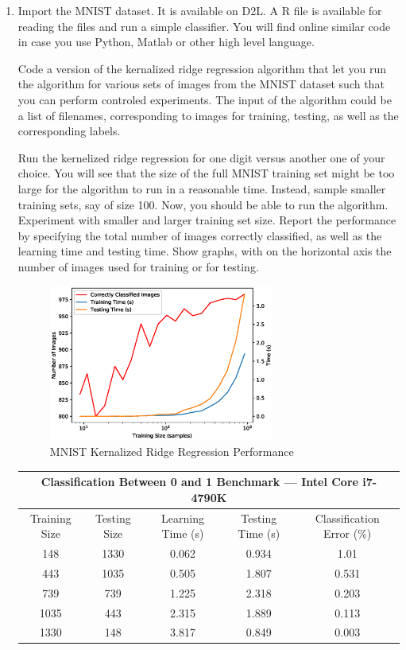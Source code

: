 \documentclass{article}[12pt]
\begin{document}
\begin{enumerate}
\item Import the MNIST dataset. It is available on D2L. A R file is available for reading the files and run a simple classifier.  You will find online similar code in case you use Python,  Matlab or other high level language. 

Code a version of the kernalized ridge regression algorithm that let you run the algorithm for various sets of images from the MNIST dataset such that you can perform controled experiments. The input of the algorithm could be a list of filenames, corresponding to images for training, testing, as well as the corresponding labels.  

Run the kernelized ridge regression for one digit versus another one of your choice. You will see that the size of the full MNIST training set might be too large for the algorithm to run in a reasonable time. Instead, sample smaller training sets, say of size 100. Now, you should be able to run the algorithm. Experiment with smaller and larger training set size. Report the performance by specifying the total number of images correctly classified, as well as the learning time and testing time. Show graphs, with on the horizontal axis the number of images used for training or for testing. 

\begin{figure}[H]
\centering
\includegraphics[width=0.7\textwidth]{./img/mnist_perf.eps}
\caption{MNIST Kernalized Ridge Regression Performance}
\end{figure}

\begin{table}[h]
\centering
\begin{tabular}{|c|c|c|c|c|} \hline
\multicolumn{5}{|c|}{Classification Between 0 and 1 Benchmark --- Intel Core i7-4790K} \\ \hline
 Training Size & Testing Size & Learning Time (s) & Testing Time (s) & Classification Error (\%) \\ \hline \hline
  148 & 1330 & 0.062 & 0.934 & 1.01 \\ \hline
  443 & 1035 & 0.505 & 1.807 & 0.531 \\ \hline
  739 & 739 & 1.225 & 2.318 & 0.203 \\ \hline
  1035 & 443 & 2.315 & 1.889 & 0.113 \\ \hline
  1330 & 148 & 3.817 & 0.849 & 0.003 \\ \hline
\end{tabular}


\end{table}
\end{enumerate}
\end{document}
